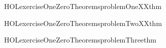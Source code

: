 \newcommand{\HOLexerciseOneZeroDate}{30 January 2020}
\newcommand{\HOLexerciseOneZeroTime}{20:37}
\begin{SaveVerbatim}{HOLexerciseOneZeroTheoremsproblemOneXXthm}
\HOLTokenTurnstile{}  
\end{SaveVerbatim}
\newcommand{\HOLexerciseOneZeroTheoremsproblemOneXXthm}{\UseVerbatim{HOLexerciseOneZeroTheoremsproblemOneXXthm}}
\begin{SaveVerbatim}{HOLexerciseOneZeroTheoremsproblemTwoXXthm}
\HOLTokenTurnstile{}  \HOLSymConst{\HOLTokenImp{}} \HOLSymConst{\HOLTokenNeg{}}
\end{SaveVerbatim}
\newcommand{\HOLexerciseOneZeroTheoremsproblemTwoXXthm}{\UseVerbatim{HOLexerciseOneZeroTheoremsproblemTwoXXthm}}
\begin{SaveVerbatim}{HOLexerciseOneZeroTheoremsproblemThreethm}
\HOLTokenTurnstile{}  \HOLSymConst{\HOLTokenDisj{}} 
\end{SaveVerbatim}
\newcommand{\HOLexerciseOneZeroTheoremsproblemThreethm}{\UseVerbatim{HOLexerciseOneZeroTheoremsproblemThreethm}}
\newcommand{\HOLexerciseOneZeroTheorems}{
\HOLThmTag{exercise10}{problem1_thm}\HOLexerciseOneZeroTheoremsproblemOneXXthm
\HOLThmTag{exercise10}{problem2_thm}\HOLexerciseOneZeroTheoremsproblemTwoXXthm
\HOLThmTag{exercise10}{problem3thm}\HOLexerciseOneZeroTheoremsproblemThreethm
}
